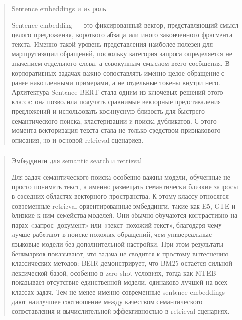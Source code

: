 \documentclass[
]{article}
\begin{document}
\begin{quote}
Sentence embeddings и их роль

Sentence embedding --- это фиксированный вектор, представляющий смысл
целого предложения, короткого абзаца или иного законченного фрагмента
текста. Именно такой уровень представления наиболее полезен для
маршрутизации обращений, поскольку категория запроса определяется не
значением отдельного слова, а совокупным смыслом всего сообщения. В
корпоративных задачах важно сопоставлять именно целое обращение с ранее
накопленными примерами, а не отдельные токены внутри него. Архитектура
Sentence-BERT стала одним из ключевых решений этого класса: она
позволила получать сравнимые векторные представаления предложений и
использовать косинусную близость для быстрого семантического поиска,
кластеризации и поиска дубликатов. С этого момента векторизация текста
стала не только средством признакового описания, но и основой
retrieval-сценариев.
\end{quote}

\hypertarget{section-5}{%
\subsubsection{}\label{section-5}}

\begin{quote}
Эмбеддинги для semantic search и retrieval

Для задач семантического поиска особенно важны модели, обученные не
просто понимать текст, а именно размещать семантически близкие запросы в
соседних областях векторного пространства. К этому классу относятся
современные retrieval-ориентированные эмбеддинги, такие как E5, GTE и
близкие к ним семейства моделей. Они обычно обучаются контрастивно на
парах «запрос--документ» или «текст--похожий текст», благодаря чему
лучше работают в поиске похожих обращений, чем универсальные языковые
модели без дополнительной настройки. При этом результаты бенчмарков
показывают, что задача не сводится к простому вытеснению классических
методов: BEIR демонстрирует, что BM25 остаётся сильной лексической
базой, особенно в zero-shot условиях, тогда как MTEB показывает
отсутствие единственной модели, одинаково лучшей на всех классах задач.
Тем не менее именно современные sentence embeddings дают наилучшее
соотношение между качеством семантического сопоставления и
вычислительной эффективностью в retrieval-сценариях.
\end{quote}

\hypertarget{section-6}{%
\subsubsection{}\label{section-6}}
\end{document}
